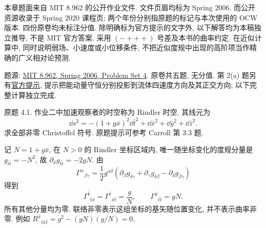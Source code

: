 \label{ch:gr-ps04-07}

本章题面来自 MIT 8.962 的公开作业文件. 文件页眉均标为 Spring 2006, 而公开资源收录于 Spring 2020 课程页; 两个年份分别指原题的标记与本次使用的 OCW 版本. 四份原卷均未标注分值. 除明确标为官方提示的文字外, 以下解答均为本稿独立推导, 不是 MIT 官方答案. 采用 $(-+++)$ 号差及本书的曲率约定. 在近似计算中, 同时说明弱场、小速度或小位移条件, 不把近似度规中出现的高阶项当作精确的广义相对论预测.

\label{sec:gr-ps04}

题源: \href{https://ocw.mit.edu/courses/8-962-general-relativity-spring-2020/resources/mit8_962s20_pset04/}{MIT 8.962, Spring 2006, Problem Set 4}. 原卷共五题, 无分值. 第 2(a) 题另有\href{https://ocw.mit.edu/courses/8-962-general-relativity-spring-2020/resources/mit8_962s20_pset04_hint/}{官方提示}, 提示把能动量守恒分别投影到流体四速度方向及其正交方向; 以下完整计算独立完成.

\begin{exercise}
原题 4.1. 作业二中加速观察者的时空称为 Rindler 时空, 其线元为
\[
\dd s^2=-(1+g\bar x)^2\dd\bar t^2+\dd\bar x^2+\dd\bar y^2+\dd\bar z^2.
\]
求全部非零 Christoffel 符号. 原题提示可参考 Carroll 第 3.3 题.
\end{exercise}
\begin{solution}
记 $N=1+g\bar x$, 在 $N>0$ 的 Rindler 坐标区域内, 唯一随坐标变化的度规分量是 $g_{\bar t\bar t}=-N^2$, 故 $\partial_{\bar x}g_{\bar t\bar t}=-2gN$. 由
\[
\Gamma^\alpha{}_{\beta\gamma}=\frac12g^{\alpha\delta}
(\partial_\beta g_{\delta\gamma}+\partial_\gamma g_{\delta\beta}-\partial_\delta g_{\beta\gamma})
\]
得到
\[
\Gamma^{\bar t}{}_{\bar t\bar x}=\Gamma^{\bar t}{}_{\bar x\bar t}=\frac gN,
\qquad \Gamma^{\bar x}{}_{\bar t\bar t}=gN.
\]
所有其他分量均为零. 联络非零表示这组坐标的基矢随位置变化, 并不表示曲率非零. 例如 $R^{\bar x}{}_{\bar t\bar x\bar t}=g^2-(gN)(g/N)=0$.
\end{solution}

